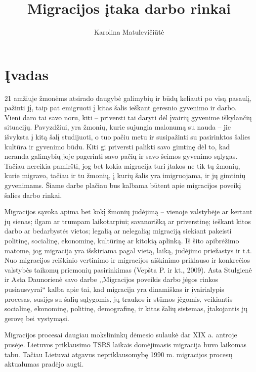 \documentclass[11pt, titlepage]{article}
\title{Migracijos įtaka darbo rinkai}
\author{Karolina Matulevičiūtė}
\begin{document}
\maketitle
\tableofcontents
\newpage

\section{Įvadas}




	21 amžiuje žmonėms atsirado daugybė galimybių  ir būdų keliauti po visą pasaulį, pažinti jį, taip pat emigruoti į kitas šalis ieškant geresnio gyvenimo ir darbo.  Vieni daro tai savo noru, kiti – priversti tai daryti dėl įvairių gyvenime iškylančių situacijų. Pavyzdžiui, yra žmonių, kurie sujungia malonumą su nauda – jie išvyksta į kitą šalį studijuoti, o tuo pačiu metu ir susipažinti su pasirinktos šalies kultūra ir gyvenimo būdu. Kiti gi priversti palikti savo gimtinę dėl to, kad neranda galimybių joje pagerinti savo pačių ir savo šeimos gyvenimo sąlygas.  Tačiau nereikia pamiršti, jog bet kokia migracija turi įtakos ne tik tų žmonių, kurie migravo, tačiau ir tu žmonių, į kurių šalis yra imigruojama, ir jų gimtinių gyvenimams. Šiame darbe plačiau bus kalbama būtent apie migracijos poveikį šalies darbo rinkai. 

	Migracijos sąvoka apima bet kokį žmonių judėjimą – vienoje valstybėje ar kertant jų sienas; ilgam ar trumpam laikotarpiui; savanorišką ar priverstinę; ieškant kitos darbo ar bedarbystės vietos; legalią ar nelegalią; migraciją siekiant pakeisti politinę, socialinę, ekonominę, kultūrinę ar kitokią aplinką. Iš šito apibrėžimo matome, jog migracija yra išskiriama pagal vietą, laiką, judėjimo priežastys ir t.t. Nuo migracijos reiškinio vertinimo ir migracijos aiškinimo priklauso ir konkrečios valstybės taikomų priemonių pasirinkimas (Vepšta P. ir kt., 2009). Asta Stulgienė ir Asta Daunorienė savo darbe ,,Migracijos poveikis darbo jėgos rinkos pusiausvyrai“ kalba apie tai, kad migracija yra dinamiškas ir įvairialypis procesas, susijęs su šalių sąlygomis, jų traukos ir stūmos jėgomis, veikiantis socialinę, ekonominę, politinę, demografinę, ir kitas šalių sistemas, įtakojantis jų gerovę bei vystymąsi. 

	Migracijos procesai daugiau mokslininkų dėmesio sulaukė dar XIX a. antroje pusėje. Lietuvos priklausimo TSRS laikais domėjimasis migracija buvo laikomas tabu. Tačiau Lietuvai atgavus nepriklausomybę 1990 m. migracijos procesų aktualumas pradėjo augti. 
\end{document}
